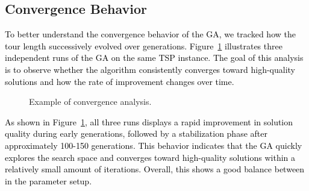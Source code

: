 \documentclass{scrartcl}
\begin{document}
\subsection{Convergence Behavior}
\textcolor{black}{To better understand the convergence behavior of the GA, we tracked how the tour length successively evolved over generations. Figure~\ref{fig:convergence} illustrates three independent runs of the GA on the same TSP instance. The goal of this analysis is to observe whether the algorithm consistently converges toward high-quality solutions and how the rate of improvement changes over time.}
\begin{figure}[H]
\centering
{}
\caption{Example of convergence analysis.}
\label{fig:convergence}
\end{figure}

\textcolor{black}{As shown in Figure~\ref{fig:convergence}, all three runs displays a rapid improvement in solution quality during early generations, followed by a stabilization phase after approximately 100-150 generations. This behavior indicates that the GA quickly explores the search space and converges toward high-quality solutions within a relatively small amount of iterations. Overall, this shows a good balance between in the parameter setup.}
\end{document}
